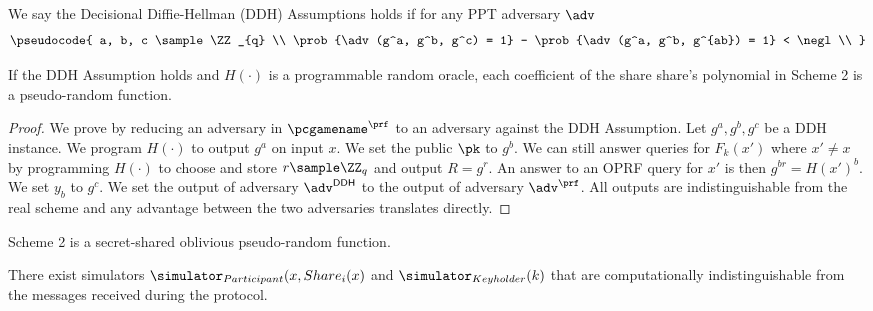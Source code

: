 \begin{definition}
We say the Decisional Diffie-Hellman (DDH) Assumptions holds if for any PPT adversary $\adv$
$$
\pseudocode{
a, b, c \sample \ZZ_{q} \\
\prob{\adv(g^a, g^b, g^c) = 1} - \prob{\adv(g^a, g^b, g^{ab}) = 1} < \negl \\
}
$$
\end{definition}

\begin{theorem}
\label{thm:sec_prf}
If the DDH Assumption holds and $H(\cdot)$ is a programmable random oracle, each coefficient of the share share's polynomial in Scheme 2 is a pseudo-random function.
\end{theorem}

\begin{proof}
We prove by reducing an adversary in $\pcgamename^{\prf}$ to an adversary against the DDH Assumption.
Let $g^a, g^b, g^c$ be a DDH instance.
We program $H(\cdot)$ to output $g^a$ on input $x$.
We set the public $\pk$ to $g^b$.
We can still answer queries for $F_{k}(x')$ where $x' \neq x$ by programming $H(\cdot)$ to choose and store $r \sample \ZZ_{q}$ and output $R = g^r$.
An answer to an OPRF query for $x'$ is then $g^{b r} = H(x')^b$.
We set $y_b$ to $g^c$.
We set the output of adversary $\adv^{\mathsf{DDH}}$ to the output of adversary $\adv^{\prf}$.
All outputs are indistinguishable from the real scheme and any advantage between the two adversaries translates directly.
\end{proof}

\begin{theorem}
Scheme 2 is a secret-shared oblivious pseudo-random function.
\end{theorem}

\begin{corollary}
There exist simulators $\simulator_{Participant}(x, Share_{i}(x)$ and $\simulator_{Keyholder}(k)$ that are computationally indistinguishable from the messages received during the protocol.
\end{corollary}


